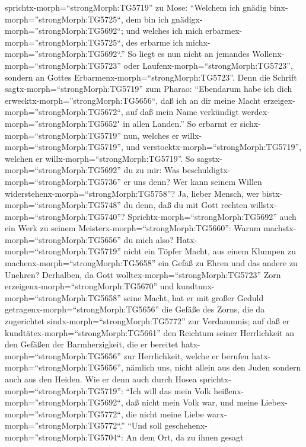 sprichtx-morph=``strongMorph:TG5719'' zu Mose: ``Welchem ich gnädig
binx-morph=''strongMorph:TG5725``, dem bin ich
gnädigx-morph=''strongMorph:TG5692``; und welches ich mich
erbarmex-morph=''strongMorph:TG5725``, des erbarme ich
michx-morph=''strongMorph:TG5692``.''  So liegt es nun
nicht an jemandes Wollenx-morph=``strongMorph:TG5723'' oder
Laufenx-morph=``strongMorph:TG5723'', sondern an Gottes
Erbarmenx-morph=``strongMorph:TG5723''.  Denn die Schrift
sagtx-morph=``strongMorph:TG5719'' zum Pharao: ``Ebendarum habe ich dich
erwecktx-morph=''strongMorph:TG5656``, daß ich an dir meine Macht
erzeigex-morph=''strongMorph:TG5672``, auf daß mein Name verkündigt
werdex-morph=''strongMorph:TG5652" in allen Landen.''  So
erbarmt er sichx-morph=``strongMorph:TG5719'' nun, welches er
willx-morph=``strongMorph:TG5719'', und
verstocktx-morph=``strongMorph:TG5719'', welchen er
willx-morph=``strongMorph:TG5719''.  So
sagstx-morph=``strongMorph:TG5692'' du zu mir: Was
beschuldigtx-morph=``strongMorph:TG5736'' er uns denn? Wer kann seinem
Willen widerstehenx-morph=``strongMorph:TG5758''?  Ja,
lieber Mensch, wer bistx-morph=``strongMorph:TG5748'' du denn, daß du
mit Gott rechten willstx-morph=``strongMorph:TG5740''?
Sprichtx-morph=``strongMorph:TG5692'' auch ein Werk zu seinem
Meisterx-morph=``strongMorph:TG5660'': Warum
machstx-morph=``strongMorph:TG5656'' du mich also? 
Hatx-morph=``strongMorph:TG5719'' nicht ein Töpfer Macht, aus einem
Klumpen zu machenx-morph=``strongMorph:TG5658'' ein Gefäß zu Ehren und
das andere zu Unehren?  Derhalben, da Gott
wolltex-morph=``strongMorph:TG5723'' Zorn
erzeigenx-morph=``strongMorph:TG5670'' und
kundtunx-morph=``strongMorph:TG5658'' seine Macht, hat er mit großer
Geduld getragenx-morph=``strongMorph:TG5656'' die Gefäße des Zorns, die
da zugerichtet sindx-morph=``strongMorph:TG5772'' zur Verdammnis;
 auf daß er kundtätex-morph=``strongMorph:TG5661'' den
Reichtum seiner Herrlichkeit an den Gefäßen der Barmherzigkeit, die er
bereitet hatx-morph=``strongMorph:TG5656'' zur Herrlichkeit,
 welche er berufen hatx-morph=``strongMorph:TG5656'',
nämlich uns, nicht allein aus den Juden sondern auch aus den Heiden.
 Wie er denn auch durch Hosea
sprichtx-morph=``strongMorph:TG5719'': ``Ich will das mein Volk
heißenx-morph=''strongMorph:TG5692``, daß nicht mein Volk war, und meine
Liebex-morph=''strongMorph:TG5772``, die nicht meine Liebe
warx-morph=''strongMorph:TG5772``.''  ``Und soll
geschehenx-morph=''strongMorph:TG5704``: An dem Ort, da zu ihnen gesagt
